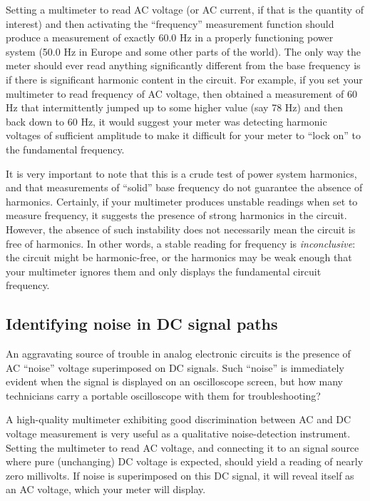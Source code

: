Setting a multimeter to read AC voltage (or AC current, if that is the quantity of interest) and then activating the ``frequency'' measurement function should produce a measurement of exactly 60.0 Hz in a properly functioning power system (50.0 Hz in Europe and some other parts of the world).  The only way the meter should ever read anything significantly different from the base frequency is if there is significant harmonic content in the circuit.  For example, if you set your multimeter to read frequency of AC voltage, then obtained a measurement of 60 Hz that intermittently jumped up to some higher value (say 78 Hz) and then back down to 60 Hz, it would suggest your meter was detecting harmonic voltages of sufficient amplitude to make it difficult for your meter to ``lock on'' to the fundamental frequency.

It is very important to note that this is a crude test of power system harmonics, and that measurements of ``solid'' base frequency do not guarantee the absence of harmonics.  Certainly, if your multimeter produces unstable readings when set to measure frequency, it suggests the presence of strong harmonics in the circuit.  However, the absence of such instability does not necessarily mean the circuit is free of harmonics.  In other words, a stable reading for frequency is \textit{inconclusive}: the circuit might be harmonic-free, or the harmonics may be weak enough that your multimeter ignores them and only displays the fundamental circuit frequency.






\filbreak
\subsection{Identifying noise in DC signal paths}

An aggravating source of trouble in analog electronic circuits is the presence of AC ``noise'' voltage superimposed on DC signals.  Such ``noise'' is immediately evident when the signal is displayed on an oscilloscope screen, but how many technicians carry a portable oscilloscope with them for troubleshooting?

A high-quality multimeter exhibiting good discrimination between AC and DC voltage measurement is very useful as a qualitative noise-detection instrument.  Setting the multimeter to read AC voltage, and connecting it to an signal source where pure (unchanging) DC voltage is expected, should yield a reading of nearly zero millivolts.  If noise is superimposed on this DC signal, it will reveal itself as an AC voltage, which your meter will display.

